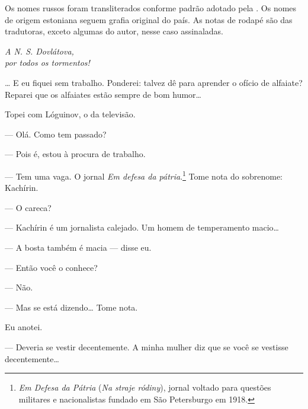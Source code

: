 
\pagebreak

\begin{vplace}[30]
\begin{centering}
Os nomes russos foram transliterados conforme padrão adotado pela .
Os nomes de origem estoniana seguem grafia original do país. As notas de
rodapé são das tradutoras, exceto algumas do autor, nesse caso assinaladas.
\end{centering}
\end{vplace}
\thispagestyle{empty}

\pagebreak

\begin{vplace}[30]
\begin{flushright}
\emph{A N. S. Dovlátova,\\por todos os tormentos!}
\end{flushright}
\end{vplace}
\thispagestyle{empty}

\pagebreak

\blankpage

\label{compromisso}
\ldots{} E eu fiquei sem trabalho. Ponderei: talvez dê para aprender o ofício
de alfaiate? Reparei que os alfaiates estão sempre de bom humor\ldots{}

Topei com Lóguinov, o da televisão.

--- Olá. Como tem passado?

--- Pois é, estou à procura de trabalho.

--- Tem uma vaga. O jornal \emph{Em defesa da pátria}.\footnote{\emph{Em
  Defesa da Pátria} (\emph{Na straje ródiny}), jornal voltado para
  questões militares e nacionalistas fundado em São Petersburgo em 1918.}
Tome nota do sobrenome: Kachírin.

--- O careca?

--- Kachírin é um jornalista calejado. Um homem de temperamento macio\ldots{}

--- A bosta também é macia --- disse eu.

--- Então você o conhece?

--- Não.

--- Mas se está dizendo\ldots{} Tome nota.

Eu anotei.

--- Deveria se vestir decentemente. A minha mulher diz que se você se
vestisse decentemente\ldots{}

